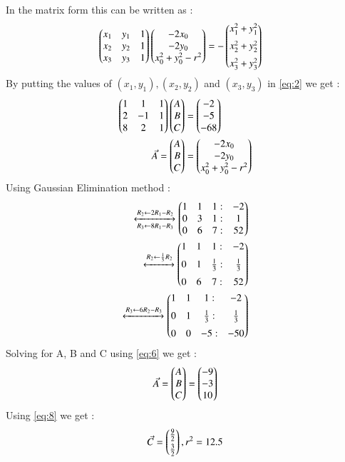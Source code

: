 \documentclass[journal,12pt,twocolumn]{IEEEtran}
\begin{document}
In the matrix form this can be written as : 
\begin{align}
 \begin{pmatrix}x_1&y_1&1\\x_2&y_2&1\\x_3&y_3&1\end{pmatrix}\begin{pmatrix}-2x_0\\-2y_0\\x_0^2+y_0^2-r^2\end{pmatrix}&=-\begin{pmatrix}x_1^2+y_1^2\\[0.2cm]x_2^2+y_2^2\\[0.2cm]x_3^2+y_3^2\end{pmatrix} \label{eq:2} 
\end{align}
By putting the values of $(x_1,y_1),(x_2,y_2)$ and $(x_3,y_3)$ in \eqref{eq:2} we get :
\begin{align}
 \begin{pmatrix}1&1&1\\2&-1&1\\8&2&1\end{pmatrix}\begin{pmatrix}A\\B\\C\end{pmatrix}&=\begin{pmatrix}-2\\-5\\-68\end{pmatrix} \label{eq:3}\\
 \Vec{A}=\begin{pmatrix}A\\B\\C\end{pmatrix}&=\begin{pmatrix}-2x_0\\-2y_0\\x_0^2+y_0^2-r^2\end{pmatrix}\label{eq:8}
\end{align}
Using Gaussian Elimination method :
\begin{align}
\xleftrightarrow[R_3 \leftarrow 8R_1-R_3]{R_2 \leftarrow 2R_1-R_2}\begin{pmatrix}1&1&1:&-2\\0&3&1:&1\\0&6&7:&52\end{pmatrix}\\
\xleftrightarrow{R_2 \leftarrow \frac{1}{3} R_2}\begin{pmatrix}1&1&1:&-2\\[0.2cm]0&1&\frac{1}{3}:&\frac{1}{3}\\[0.2cm]0&6&7:&52\end{pmatrix}\\
\xleftrightarrow{R_3 \leftarrow 6R_2-R_3}\begin{pmatrix}1&1&1:&-2\\[0.2cm]0&1&\frac{1}{3}:&\frac{1}{3}\\[0.2cm]0&0&-5:&-50\end{pmatrix}\label{eq:6}
\end{align}
Solving for A, B and C using \eqref{eq:6} we get : 
\begin{align}
\Vec{A}=\begin{pmatrix}A\\B\\C\end{pmatrix}=\begin{pmatrix}-9\\-3\\10\end{pmatrix}
\end{align}
Using \eqref{eq:8} we get :
\begin{align}
  \Vec{C}=\begin{pmatrix}\frac{9}{2}\\[0.1cm]\frac{3}{2}\end{pmatrix}, r^2=12.5   
\end{align}
\end{document}
